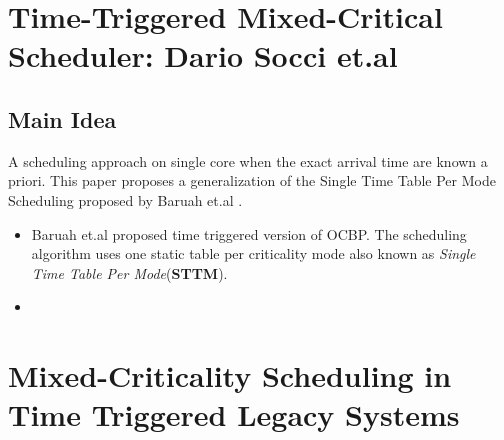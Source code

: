 \section{Time-Triggered Mixed-Critical Scheduler: Dario Socci et.al}
\subsection*{Main Idea}
A scheduling approach on single core when the exact arrival time are known a priori. This paper proposes a generalization of the Single Time Table Per Mode Scheduling proposed by Baruah et.al .
\begin{itemize}
	\item Baruah et.al proposed time triggered version of OCBP. The scheduling algorithm uses one static table per criticality mode also known as \textit{Single Time Table Per Mode}(\textbf{STTM}).
	\item 
\end{itemize}

\section{Mixed-Criticality Scheduling in Time Triggered Legacy Systems}
